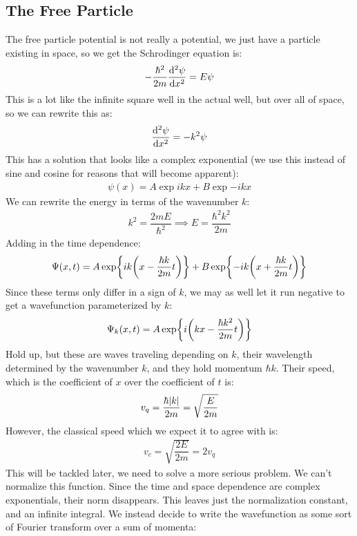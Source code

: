 \subsection{The Free Particle}
The free particle potential is not really a potential, we just have a particle existing in space, so we get the Schrodinger equation is:
\begin{align*}
  -\dfrac{\hbar^2}{2m}\dv[2]{\psi}{x}=E\psi
\end{align*}
This is a lot like the infinite square well in the actual well, but over all of space, so we can rewrite this as:
\begin{align*}
  \dv[2]{\psi}{x}=-k^2\psi
\end{align*}
This has a solution that looks like a complex exponential (we use this instead of sine and cosine for reasons that will become apparent):
\begin{align*}
  \psi(x)=A\exp{ikx}+B\exp{-ikx}
\end{align*}
We can rewrite the energy in terms of the wavenumber $k$:
\begin{align*}
  k^2=\dfrac{2mE}{\hbar^2}\implies E=\dfrac{\hbar^2k^2}{2m}
\end{align*}
Adding in the time dependence:
\begin{align*}
  \Psi(x,t)=A\exp{ik\qty(x-\frac{\hbar k}{2m}t)}+B\exp{-ik\qty(x+\frac{\hbar k}{2m}t)}
\end{align*}
Since these terms only differ in a sign of $k$, we may as well let it run negative to get a wavefunction parameterized by $k$:
\begin{align*}
  \Psi_k(x,t)=A\exp{i\qty(kx-\frac{\hbar k^2}{2m}t)}
\end{align*}
Hold up, but these are waves traveling depending on $k$, their wavelength determined by the wavenumber $k$, and they hold momentum $\hbar k$. Their speed, which is the coefficient of $x$ over the coefficient of $t$ is:
\begin{align*}
  v_q=\dfrac{\hbar\abs{k}}{2m}=\sqrt{\dfrac{E}{2m}}
\end{align*}
However, the classical speed which we expect it to agree with is:
\begin{align*}
  v_c=\sqrt{\dfrac{2E}{2m}}=2v_q
\end{align*}
This will be tackled later, we need to solve a more serious problem. We can't normalize this function. Since the time and space dependence are complex exponentials, their norm disappears. This leaves just the normalization constant, and an infinite integral. We instead decide to write the wavefunction as some sort of Fourier transform over a sum of momenta:
